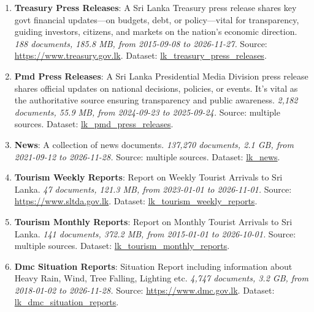 \documentclass[10pt,a4paper]{article}%
\begin{document}
\begin{enumerate}
\item%
\textbf{Treasury Press Releases}: A Sri Lanka Treasury press release shares key govt financial updates—on budgets, debt, or policy—vital for transparency, guiding investors, citizens, and markets on the nation’s economic direction.\textit{ 188 documents, 185.8 MB, from 2015{-}09{-}08 to 2026{-}11{-}27.} Source: \href{https://www.treasury.gov.lk}{https://www.treasury.gov.lk}. Dataset: \href{https://github.com/nuuuwan/lk\_treasury/tree/data\_lk\_treasury\_press\_releases/data/lk\_treasury\_press\_releases}{lk\_treasury\_press\_releases}.%
\item%
\textbf{Pmd Press Releases}: A Sri Lanka Presidential Media Division press release shares official updates on national decisions, policies, or events. It’s vital as the authoritative source ensuring transparency and public awareness.\textit{ 2,182 documents, 55.9 MB, from 2024{-}09{-}23 to 2025{-}09{-}24.} Source: multiple sources. Dataset: \href{https://github.com/nuuuwan/lk\_pmd/tree/data\_lk\_pmd\_press\_releases/data/lk\_pmd\_press\_releases}{lk\_pmd\_press\_releases}.%
\item%
\textbf{News}: A collection of news documents.\textit{ 137,270 documents, 2.1 GB, from 2021{-}09{-}12 to 2026{-}11{-}28.} Source: multiple sources. Dataset: \href{https://github.com/nuuuwan/lk\_news/tree/data/data/lk\_news}{lk\_news}.%
\item%
\textbf{Tourism Weekly Reports}: Report on Weekly Tourist Arrivals to Sri Lanka.\textit{ 47 documents, 121.3 MB, from 2023{-}01{-}01 to 2026{-}11{-}01.} Source: \href{https://www.sltda.gov.lk}{https://www.sltda.gov.lk}. Dataset: \href{https://github.com/nuuuwan/lk\_tourism/tree/data\_lk\_tourism\_weekly\_reports/data/lk\_tourism\_weekly\_reports}{lk\_tourism\_weekly\_reports}.%
\item%
\textbf{Tourism Monthly Reports}: Report on Monthly Tourist Arrivals to Sri Lanka.\textit{ 141 documents, 372.2 MB, from 2015{-}01{-}01 to 2026{-}10{-}01.} Source: multiple sources. Dataset: \href{https://github.com/nuuuwan/lk\_tourism/tree/data\_lk\_tourism\_monthly\_reports/data/lk\_tourism\_monthly\_reports}{lk\_tourism\_monthly\_reports}.%
\item%
\textbf{Dmc Situation Reports}: Situation Report including information about Heavy Rain, Wind, Tree Falling, Lighting etc.\textit{ 4,747 documents, 3.2 GB, from 2018{-}01{-}02 to 2026{-}11{-}28.} Source: \href{https://www.dmc.gov.lk}{https://www.dmc.gov.lk}. Dataset: \href{https://github.com/nuuuwan/lk\_dmc/tree/data\_lk\_dmc\_situation\_reports/data/lk\_dmc\_situation\_reports}{lk\_dmc\_situation\_reports}.%

\end{enumerate}
\end{document}
